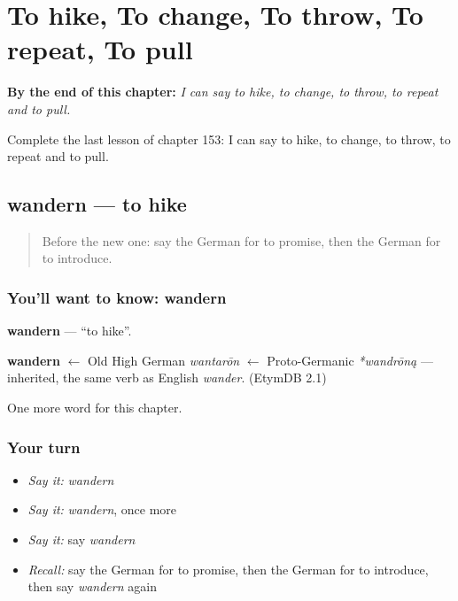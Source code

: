 
\chapter{To hike, To change, To throw, To repeat, To pull}
\label{ch:ge-to-hike-to-change-to-throw-to-repeat-to-pull}

\begin{chapteropening}
\textbf{By the end of this chapter:} \emph{I can say to hike, to change, to throw, to repeat and to pull.}

Complete the last lesson of chapter 153: I can say to hike, to change, to throw, to repeat and to pull.
\end{chapteropening}

\section[wandern]{wandern — to hike}

\label{lesson:GE-C153-wandern}



\begin{quote}
Before the new one: say the German for to promise, then the German for to introduce.
\end{quote}

\subsection*{You'll want to know: wandern}
\textbf{wandern} — \textquotedblleft{}to hike\textquotedblright{}.

\begin{cousinweb}
\textbf{wandern} $\leftarrow$ Old High German \emph{wantarōn} $\leftarrow$ Proto-Germanic \emph{*wandrōną} — inherited, the same verb as English \emph{wander}. (EtymDB 2.1)
\end{cousinweb}

\begin{grammarlens}[title={What you've built}]
One more word for this chapter.
\end{grammarlens}

\subsection*{Your turn}
\begin{itemize}
\raggedright
  \item \emph{Say it:} \emph{wandern}
  \item \emph{Say it:} \emph{wandern}, once more
  \item \emph{Say it:} say \emph{wandern}
  \item \emph{Recall:} say the German for to promise, then the German for to introduce, then say \emph{wandern} again
\end{itemize}

